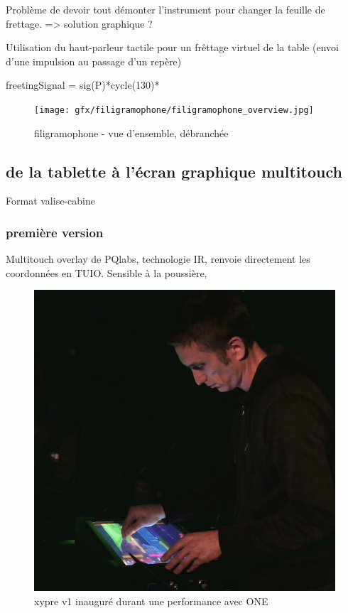 Problème de devoir tout démonter l'instrument pour changer la feuille de frettage. => solution graphique ?

Utilisation du haut-parleur tactile pour un frêttage virtuel de la table (envoi d'une impulsion au passage d'un repère)


freetingSignal = sig(P)*cycle(130)*

\begin{figure}[!htbp]
	\texttt{[image: gfx/filigramophone/filigramophone\_overview.jpg]}
	\caption{filigramophone - vue d'ensemble, débranchée}
	\label{fig:interface:filigramophone}
\end{figure}

\subsection{de la tablette à l'écran graphique multitouch}

Format valise-cabine

\subsubsection{première version}
Multitouch overlay de PQlabs, technologie IR, renvoie directement les coordonnées en TUIO. Sensible à la poussière,
\begin{figure}[!htbp]
	\includegraphics[width=\textwidth]{gfx/05_interfaces/xypre-v1_72dpi.jpg}
	\caption{xypre v1 inauguré durant une performance avec ONE}
	\label{fig:interface:xyprev1_jeu}
\end{figure}


